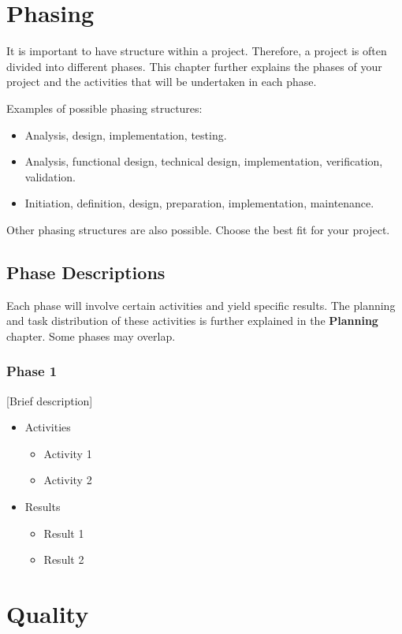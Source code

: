 \documentclass{article}
\begin{document}
\newpage

\section{Phasing}
It is important to have structure within a project. Therefore, a project is often divided into different phases. This chapter further explains the phases of your project and the activities that will be undertaken in each phase.

Examples of possible phasing structures:
\begin{itemize}
    \item Analysis, design, implementation, testing.
    \item Analysis, functional design, technical design, implementation, verification, validation.
    \item Initiation, definition, design, preparation, implementation, maintenance.
\end{itemize}
Other phasing structures are also possible. Choose the best fit for your project.

\subsection{Phase Descriptions}
Each phase will involve certain activities and yield specific results. The planning and task distribution of these activities is further explained in the \textbf{Planning} chapter. Some phases may overlap.

\subsubsection{Phase 1}
[Brief description]
\begin{itemize}
    \item Activities
    \begin{itemize}
        \item Activity 1
        \item Activity 2
    \end{itemize}
    \item Results
    \begin{itemize}
        \item Result 1
        \item Result 2
    \end{itemize}
\end{itemize}


\newpage

\section{Quality}
\end{document}
